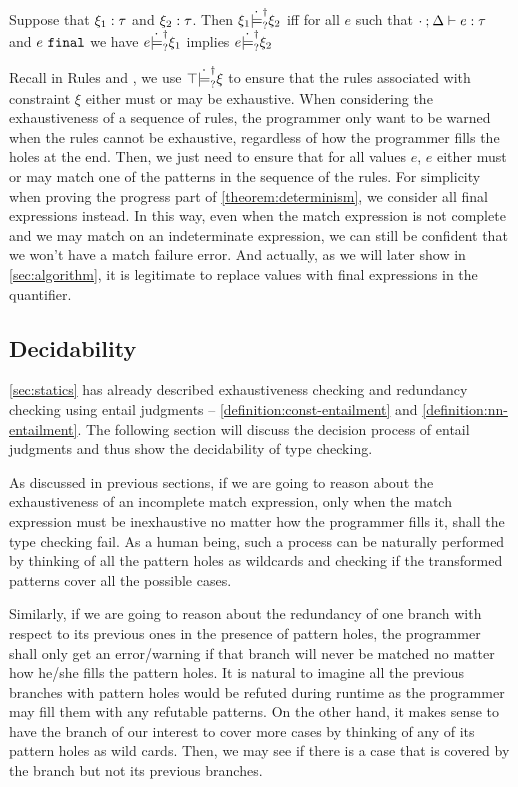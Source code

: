 \begin{definition}
  \label{definition:nn-entailment}
  Suppose that $\xi_1 : \tau$ and $\xi_2 : \tau$. Then $\xi_1 \dot{\models}_{?}^{\dag} \xi_2$ iff for all $e$ such that $\cdot \mathbin{;} \Delta \vdash e : \tau$ and $e ~\mathtt{final}$ we have $e \dot{\models}_{?}^{\dag} \xi_1$ implies $e \dot{\models}_{?}^{\dag} \xi_2$ 
\end{definition}

Recall in Rules \TMatchZPre and \TMatchNZPre, we use $\top \dot{\models}_{?}^{\dag} \xi$ to ensure that the rules associated with constraint $\xi$ either must or may be exhaustive. When considering the exhaustiveness of a sequence of rules, the programmer only want to be warned when the rules cannot be exhaustive, regardless of how the programmer fills the holes at the end. Then, we just need to ensure that for all values $e$, $e$ either must or may match one of the patterns in the sequence of the rules. For simplicity when proving the progress part of  \autoref{theorem:determinism}, we consider all final expressions instead. In this way, even when the match expression is not complete and we may match on an indeterminate expression, we can still be confident that we won't have a match failure error. And actually, as we will later show in \autoref{sec:algorithm}, it is legitimate to replace values with final expressions in the quantifier.

\subsection{Decidability}\label{sec:algorithm}

\autoref{sec:statics} has already described exhaustiveness checking and redundancy checking using entail judgments -- \autoref{definition:const-entailment} and
\autoref{definition:nn-entailment}. The following section will discuss the decision process of entail judgments and thus show the decidability of type checking.

As discussed in previous sections, if we are going to reason about the exhaustiveness of an incomplete match expression, only when the match expression must be inexhaustive no matter how the programmer fills it, shall the type checking fail. As a human being, such a process can be naturally performed by thinking of all the pattern holes as wildcards and checking if the transformed patterns cover all the possible cases. 

Similarly, if we are going to reason about the redundancy of one branch with respect to its previous ones in the presence of pattern holes, the programmer shall only get an error/warning if that branch will never be matched no matter how he/she fills the pattern holes. It is natural to imagine all the previous branches with pattern holes would be refuted during runtime as the programmer may fill them with any refutable patterns. On the other hand, it makes sense to have the branch of our interest to cover more cases by thinking of any of its pattern holes as wild cards. Then, we may see if there is a case that is covered by the branch but not its previous branches.

